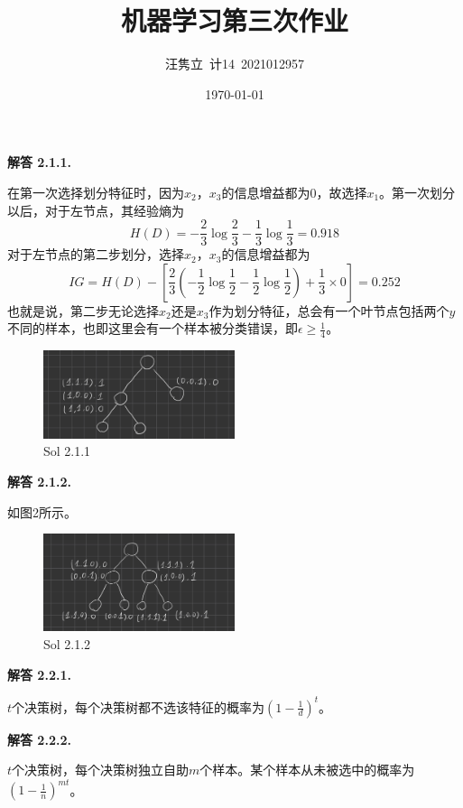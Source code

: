 \documentclass[12pt, a4paper, oneside]{ctexart}
\title{\textbf{机器学习第三次作业}}
\author{汪隽立\ 计14\ 2021012957}
\date{\today}
\newenvironment{solution}[1]{\par\noindent\textbf{解答 #1. }\par}{\par}
\begin{document}
\maketitle

\begin{solution}{2.1.1}
    在第一次选择划分特征时，因为$x_2$，$x_3$的信息增益都为$0$，故选择$x_1$。第一次划分以后，对于左节点，其经验熵为
    $$
        H(D)=-\frac{2}{3}\log\frac{2}{3}-\frac{1}{3}\log\frac{1}{3}=0.918
    $$
    对于左节点的第二步划分，选择$x_2$，$x_3$的信息增益都为
    $$
        IG = H(D)-\left[\frac{2}{3}(-\frac{1}{2}\log\frac{1}{2}-\frac{1}{2}\log\frac{1}{2})+\frac{1}{3}\times0\right]=0.252
    $$
    也就是说，第二步无论选择$x_2$还是$x_3$作为划分特征，总会有一个叶节点包括两个$y$不同的样本，也即这里会有一个样本被分类错误，即$\epsilon\ge\frac{1}{4}$。
    \begin{figure}[htbp]
        \centering
        \includegraphics[width=0.5\textwidth]{pic/1.jpeg}
        \caption{Sol 2.1.1}
    \end{figure}
\end{solution}

\begin{solution}{2.1.2}
    如图2所示。
    \begin{figure}[htbp]
        \centering
        \includegraphics[width=0.5\textwidth]{pic/2.jpeg}
        \caption{Sol 2.1.2}
    \end{figure}
\end{solution}

\begin{solution}{2.2.1}
    $t$个决策树，每个决策树都不选该特征的概率为$(1-\frac{1}{d})^t$。
\end{solution}

\begin{solution}{2.2.2}
    $t$个决策树，每个决策树独立自助$m$个样本。某个样本从未被选中的概率为$(1-\frac{1}{n})^{mt}$。
\end{solution}
\end{document}
